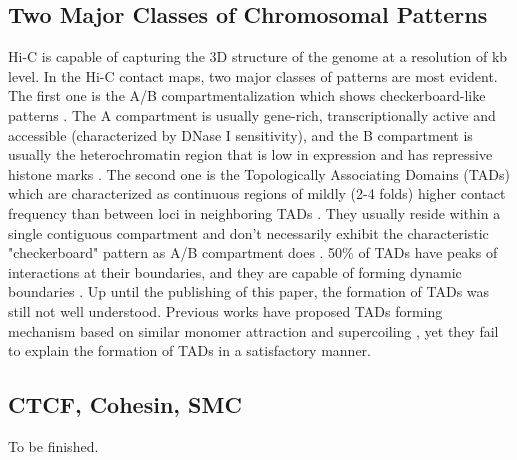 \documentclass[11pt]{article}
\begin{document}
\subsection{Two Major Classes of Chromosomal Patterns}

Hi-C is capable of capturing the 3D structure of the genome at a resolution of kb level. In the Hi-C contact maps, two major classes of patterns are most evident. The first one is the A/B compartmentalization which shows checkerboard-like patterns \cite{mirny_two_2019}. The A compartment is usually gene-rich, transcriptionally active and accessible (characterized by DNase I sensitivity), and the B compartment is usually the heterochromatin region that is low in expression and has repressive histone marks \cite{denker_second_2016}\cite{wit_decade_2012}. The second one is the Topologically Associating Domains (TADs) which are characterized as continuous regions of mildly (2-4 folds) higher contact frequency than between loci in neighboring TADs \cite{mirny_two_2019}. They usually reside within a single contiguous compartment and don't necessarily exhibit the characteristic "checkerboard" pattern as A/B compartment does \cite{fudenberg_formation_2016}. 50\% of TADs have peaks of interactions at their boundaries, and they are capable of forming dynamic boundaries \cite{rao_3d_2014}. Up until the publishing of this paper, the formation of TADs was still not well understood. Previous works have proposed TADs forming mechanism based on similar monomer attraction \cite{jost_modeling_2014} and supercoiling \cite{benedetti_models_2014}, yet they fail to explain the formation of TADs in a satisfactory manner.


\subsection{CTCF, Cohesin, SMC}

To be finished.
\end{document}
